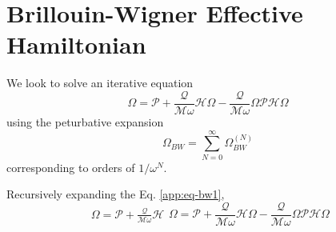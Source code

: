 \chapter{Brillouin-Wigner Effective Hamiltonian}
We look to solve an iterative equation
\begin{equation}
 \label{app:eq-bw1}\Omega = \mathcal{P} + \frac{\mathcal{Q}}{\mathcal{M}\omega}\mathcal{H}\Omega - \frac{\mathcal{Q}}{\mathcal{M}\omega}\Omega\mathcal{P}\mathcal{H}\Omega
\end{equation}
using the peturbative expansion
\begin{equation}
 \Omega_{BW} = \sum_{N=0}^{\infty}\Omega_{BW}^{(N)}
\end{equation} corresponding to orders of $1/\omega^N$.

Recursively expanding the Eq. \eqref{app:eq-bw1},
\begin{equation}
  \begin{split}
   \Omega = \mathcal{P} + \frac{\mathcal{Q}}{\mathcal{M}\omega}\mathcal{H}
  \end{split}
 \Omega = \mathcal{P} + \frac{\mathcal{Q}}{\mathcal{M}\omega}\mathcal{H}\Omega - \frac{\mathcal{Q}}{\mathcal{M}\omega}\Omega\mathcal{P}\mathcal{H}\Omega
\end{equation}


